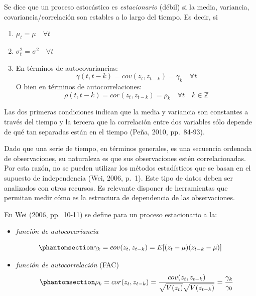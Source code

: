 \documentclass[12pt]{article}
\providecommand{\tightlist}{%
  \setlength{\itemsep}{0pt}\setlength{\parskip}{0pt}}\usepackage{longtable,booktabs,array}
\begin{document}
Se dice que un proceso estocástico es \emph{estacionario} (débil) si la
media, variancia, covariancia/correlación son estables a lo largo del
tiempo. Es decir, si

\begin{enumerate}

    \item $\mu_t = \mu \quad \forall t$ 

    \item $\sigma^2_t = \sigma^2 \quad \forall t$ 

    \item En términos de autocovariancias: $$\gamma(t, t-k) = cov(z_t, z_{t-k}) = \gamma_k \quad \forall t$$
    O bien en términos de autocorrelaciones: $$\rho(t, t-k) = cor(z_t, z_{t-k}) = \rho_k \quad \forall t \quad k \in \mathbb{Z}$$
    
\end{enumerate}

Las dos primeras condiciones indican que la media y variancia son
constantes a través del tiempo y la tercera que la correlación entre dos
variables sólo depende de qué tan separadas están en el tiempo (Peña,
2010, pp.~84-93).

Dado que una serie de tiempo, en términos generales, es una secuencia
ordenada de observaciones, su naturaleza es que sus observaciones estén
correlacionadas. Por esta razón, no se pueden utilizar los métodos
estadísticos que se basan en el supuesto de independencia (Wei, 2006,
p.~1). Este tipo de datos deben ser analizados con otros recursos. Es
relevante disponer de herramientas que permitan medir cómo es la
estructura de dependencia de las observaciones.

En Wei (2006, pp.~10-11) se define para un proceso estacionario a la:

\begin{itemize}
\tightlist
\item
  \emph{función de autocovariancia}
\end{itemize}

\begin{equation}\phantomsection\label{eq-fc_autocov_estac}{
\gamma_k = cov(z_t, z_{t-k}) = E[(z_t - \mu)(z_{t-k} - \mu)]
}\end{equation}

\begin{itemize}
\tightlist
\item
  \emph{función de autocorrelación} (FAC)
  \begin{equation}\phantomsection\label{eq-acf}{
  \rho_k = cor(z_t, z_{t-k}) = \dfrac{cov(z_t, z_{t-k})}{\sqrt{V(z_t)} \sqrt{V(z_{t-k})}} = \dfrac{\gamma_k}{\gamma_0}
  }\end{equation}
\end{itemize}
\end{document}
